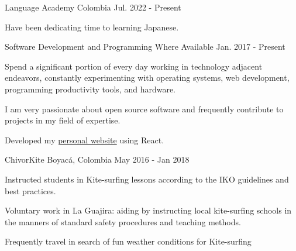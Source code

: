 

\begin{cventries}

	{Language Academy} %
	{Colombia} %
	{Jul. 2022 {-} Present} %
	{
		\begin{cvitems} %
			\item {Have been dedicating time to learning Japanese.}
		\end{cvitems}
	}

	{Software Development and Programming} %
	{Where Available} %
	{Jan. 2017 {-} Present} %
	{
		\begin{cvitems} %
			\item {Spend a significant portion of every day working in technology adjacent endeavors, constantly experimenting with operating systems, web development, programming productivity tools, and hardware.}
			\item {I am very passionate about open source software and frequently contribute to projects in my field of expertise.}
			\item {Developed my \href{https://mantimantilla.github.io/}{personal website} using React.}
		\end{cvitems}
	}

	{ChivorKite} %
	{Boyacá, Colombia} %
	{May 2016 {-} Jan 2018 } %
	{
		\begin{cvitems} %
			\item {Instructed students in Kite-surfing lessons according to the IKO guidelines and best practices.}
			\item {Voluntary work in La Guajira: aiding by instructing local kite-surfing schools in the manners
			            of standard safety procedures and teaching methods.}
			\item {Frequently travel in search of fun weather conditions for Kite-surfing}
		\end{cvitems}
	}


\end{cventries}
